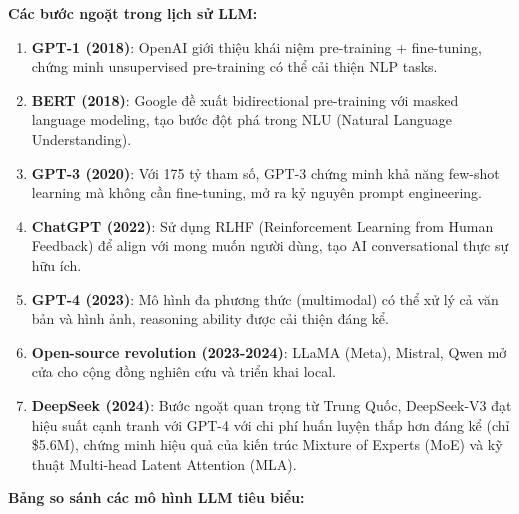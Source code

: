 \textbf{Các bước ngoặt trong lịch sử LLM:}
\begin{enumerate}
    \item \textbf{GPT-1 (2018)}: OpenAI giới thiệu khái niệm pre-training + fine-tuning, chứng minh unsupervised pre-training có thể cải thiện NLP tasks.

    \item \textbf{BERT (2018)}: Google đề xuất bidirectional pre-training với masked language modeling, tạo bước đột phá trong NLU (Natural Language Understanding).

    \item \textbf{GPT-3 (2020)}: Với 175 tỷ tham số, GPT-3 chứng minh khả năng few-shot learning mà không cần fine-tuning, mở ra kỷ nguyên prompt engineering.

    \item \textbf{ChatGPT (2022)}: Sử dụng RLHF (Reinforcement Learning from Human Feedback) để align với mong muốn người dùng, tạo AI conversational thực sự hữu ích.

    \item \textbf{GPT-4 (2023)}: Mô hình đa phương thức (multimodal) có thể xử lý cả văn bản và hình ảnh, reasoning ability được cải thiện đáng kể.

    \item \textbf{Open-source revolution (2023-2024)}: LLaMA (Meta), Mistral, Qwen mở cửa cho cộng đồng nghiên cứu và triển khai local.

    \item \textbf{DeepSeek (2024)}: Bước ngoặt quan trọng từ Trung Quốc, DeepSeek-V3 đạt hiệu suất cạnh tranh với GPT-4 với chi phí huấn luyện thấp hơn đáng kể (chỉ \$5.6M), chứng minh hiệu quả của kiến trúc Mixture of Experts (MoE) và kỹ thuật Multi-head Latent Attention (MLA).
\end{enumerate}

\textbf{Bảng so sánh các mô hình LLM tiêu biểu:}

